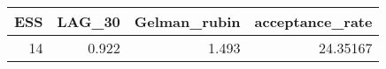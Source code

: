 \begin{longtable}{rrrr}
\toprule
ESS & LAG\_30 & Gelman\_rubin & acceptance\_rate \\ 
\midrule
14 & 0.922 & 1.493 & 24.35167 \\ 
\bottomrule
\end{longtable}

